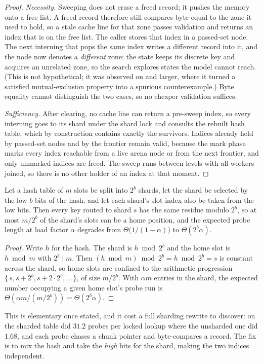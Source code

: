 \begin{proof}
\emph{Necessity.}  Sweeping does not erase a freed record; it pushes the memory
onto a free list.  A freed record therefore still compares byte-equal to the
zone it used to hold, so a stale cache line for that zone passes validation and
returns an index that is on the free list.  The caller stores that index in a
passed-set node.  The next interning that pops the same index writes a different
record into it, and the node now denotes a \emph{different} zone: the state
keeps its discrete key and acquires an unrelated zone, so the search explores
states the model cannot reach.  (This is not hypothetical; it was observed on
 and larger, where it turned a satisfied mutual-exclusion
property into a spurious counterexample.)  Byte equality cannot distinguish the
two cases, so no cheaper validation suffices.

\emph{Sufficiency.}  After clearing, no cache line can return a pre-sweep index,
so every interning goes to its shard under the shard lock and consults the
rebuilt hash table, which by construction contains exactly the survivors.
Indices already held by passed-set nodes and by the frontier remain valid,
because the mark phase marks every index reachable from a live arena node or
from the next frontier, and only unmarked indices are freed.  The sweep runs
between levels with all workers joined, so there is no other holder of an index
at that moment.
\end{proof}

\begin{proposition}\label{prop:shard}
Let a hash table of $m$ slots be split into $2^b$ shards, let the shard be
selected by the low $b$ bits of the hash, and let each shard's slot index also
be taken from the low bits.  Then every key routed to shard $s$ has the same
residue modulo $2^b$, so at most $m/2^b$ of the shard's slots can be a home
position, and the expected probe length at load factor $\alpha$ degrades from
$\Theta\big(1/(1-\alpha)\big)$ to $\Theta(2^b \alpha)$.
\end{proposition}

\begin{proof}
Write $h$ for the hash.  The shard is $h \bmod 2^b$ and the home slot is
$h \bmod m$ with $2^b \mid m$.  Then
$(h \bmod m) \bmod 2^b = h \bmod 2^b = s$ is constant across the shard, so home
slots are confined to the arithmetic progression $\{\,s, s+2^b, s+2\cdot 2^b,
\dots\,\}$, of size $m/2^b$.  With $\alpha m$ entries in the shard, the expected
number occupying a given home slot's probe run is $\Theta(\alpha m / (m/2^b)) =
\Theta(2^b\alpha)$.
\end{proof}

\begin{remark}
This is elementary once stated, and it cost a full sharding rewrite to
discover: on  the sharded table did $31.2$ probes per locked
lookup where the unsharded one did $1.68$, and each probe chases a chunk pointer
and byte-compares a record.  The fix is to mix the hash and take the \emph{high}
bits for the shard, making the two indices independent.
\end{remark}
